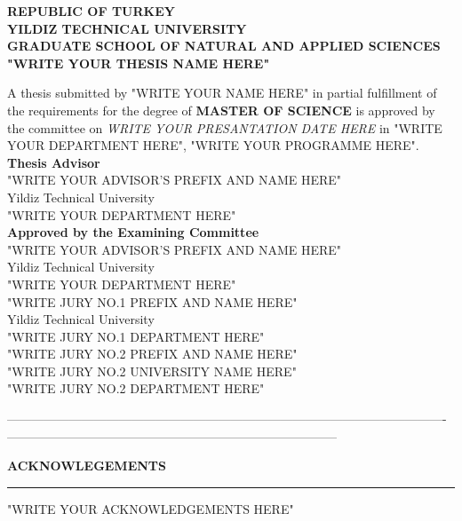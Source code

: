 \documentclass[12pt]{report}
\begin{document}
\begin{titlepage}
\begin{center}
\uppercase{\bfseries\large REPUBLIC OF TURKEY\\ YILDIZ TECHNICAL UNIVERSITY\\ GRADUATE SCHOOL OF NATURAL AND APPLIED SCIENCES}\\[1.5cm]
\uppercase{\bfseries\large "WRITE YOUR THESIS NAME HERE"}\\[1.5cm]
\end{center}
\begin{singlespacing}
\textnormal{A thesis submitted by "WRITE YOUR NAME HERE" in partial fulfillment of the requirements for the degree of \textbf{MASTER OF SCIENCE} is approved by the committee on \textit{WRITE YOUR PRESANTATION DATE HERE} in "WRITE YOUR DEPARTMENT HERE", "WRITE YOUR PROGRAMME HERE".}\\[1.5cm] %
\textbf{Thesis Advisor}\\
\textnormal{"WRITE YOUR ADVISOR'S PREFIX AND NAME HERE"\\ Yildiz Technical University\\"WRITE YOUR DEPARTMENT HERE"}\\[1.5cm]
\textbf{Approved by the Examining Committee}\\
\textnormal{"WRITE YOUR ADVISOR'S PREFIX AND NAME HERE"\\ Yildiz Technical University\\"WRITE YOUR DEPARTMENT HERE"}\\[1.5cm]
\textnormal{"WRITE JURY NO.1 PREFIX AND NAME HERE"\\ Yildiz Technical University\\"WRITE JURY NO.1 DEPARTMENT HERE"}\\[1.5cm]
\textnormal{"WRITE JURY NO.2 PREFIX AND NAME HERE" \\ "WRITE JURY NO.2 UNIVERSITY NAME HERE"\\"WRITE JURY NO.2 DEPARTMENT HERE"}\\[1.5cm]
\end{singlespacing}
\end{titlepage}
----------------------------------------------------------------------------------------------------------%
--------------------------------------------------------------------------------

\begin{titlepage}
\topmargin=80pt
\begin{flushright}
\uppercase{\bfseries{\large acknowlegements}}\\[0.5cm]
\hrule
\vspace{2ex}%
\end{flushright}
\begin{singlespacing}
"WRITE YOUR ACKNOWLEDGEMENTS HERE"

\end{singlespacing}
\end{titlepage}
\end{document}
